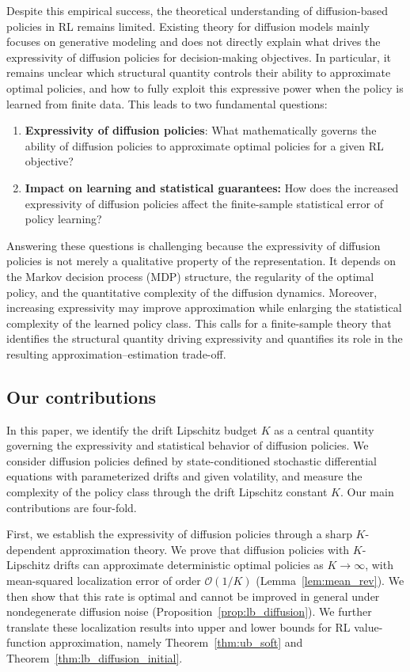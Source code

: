\documentclass{article}
\newcommand{\1}{\mathbbm{1}}
\numberwithin{equation}{section}
\def\to{\rightarrow}
\begin{document}
Despite this empirical success, the theoretical understanding of diffusion-based policies in RL remains limited. Existing theory for diffusion models mainly focuses on generative modeling and does not directly explain what drives the expressivity of diffusion policies for decision-making objectives. In particular, it remains unclear which structural quantity controls their ability to approximate optimal policies, and how to fully exploit this expressive power when the policy is learned from finite data. This leads to two fundamental questions:
\begin{enumerate}
    \item {\bf Expressivity of diffusion policies}: What mathematically governs the ability of diffusion policies to approximate optimal policies for a given RL objective?
    \item 
{\bf Impact on learning and statistical guarantees:} 
How does the increased expressivity of diffusion policies affect the finite-sample
statistical error of policy learning?
\end{enumerate}
Answering these questions is challenging because the expressivity of diffusion policies is not merely a qualitative property of the representation. It depends on the Markov decision process (MDP) structure, the regularity of the optimal policy, and the quantitative complexity of the diffusion dynamics. Moreover, increasing expressivity may improve approximation while enlarging the statistical complexity of the learned policy class. This calls for a finite-sample theory that identifies the structural quantity driving expressivity and quantifies its role in the resulting approximation--estimation trade-off.


\subsection{Our contributions}
In this paper, we identify the drift Lipschitz budget \(K\) as a central quantity governing the expressivity and statistical behavior of diffusion policies. We consider diffusion policies defined by state-conditioned stochastic differential equations with parameterized drifts and given volatility,  and measure the complexity of the policy class through the drift Lipschitz constant $K$. Our main contributions are four-fold.


First, we establish the expressivity of diffusion policies through a sharp
\(K\)-dependent approximation theory. We prove that diffusion policies with
\(K\)-Lipschitz drifts can approximate deterministic optimal policies as
\(K\to\infty\), with mean-squared localization error of order \( \mathcal{O}(1/K)\)
(Lemma~\ref{lem:mean_rev}). We then show that this rate is optimal and cannot
be improved in general under nondegenerate diffusion noise
(Proposition~\ref{prop:lb_diffusion}). We further translate these localization
results into upper and lower bounds for RL value-function approximation,
namely Theorem~\ref{thm:ub_soft} and
Theorem~\ref{thm:lb_diffusion_initial}. 
\end{document}
